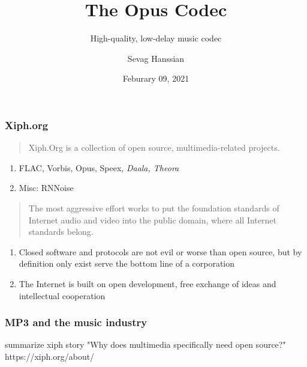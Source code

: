 \documentclass{beamer}
\title{The Opus Codec}
\subtitle{High-quality, low-delay music codec}
\author{Sevag Hanssian}
\date{Feburary 09, 2021}
\institute{MUMT 621, Winter 2021}
\begin{document}
\begin{frame}
\maketitle
\end{frame}

\begin{frame}
	\frametitle{Xiph.org}
	\begin{quote}
		Xiph.Org is a collection of open source, multimedia-related projects.
	\end{quote}
	\begin{enumerate}
			\vspace{-0.5em}
		\item
			FLAC, Vorbis, Opus, Speex, \textit{Daala, Theora}
		\item
			Misc: RNNoise
	\end{enumerate}
	\vspace{1em}
	\begin{quote}
		The most aggressive effort works to put the foundation standards of Internet audio and video into the public domain, where all Internet standards belong.
	\end{quote}
	\begin{enumerate}
			\vspace{-0.5em}
		\item
			Closed software and protocols are not evil or worse than open source, but by definition only exist serve the bottom line of a corporation
		\item
			 The Internet is built on open development, free exchange of ideas and intellectual cooperation
	\end{enumerate}
\end{frame}


\begin{frame}
	\frametitle{MP3 and the music industry}
	summarize xiph story
	"Why does multimedia specifically need open source?"
	https://xiph.org/about/
\end{frame}
\end{document}
